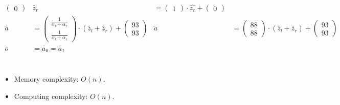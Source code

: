 \begin{align*}
\begin{pmatrix}0\end{pmatrix}
&
\widetilde{z_r} &=
\begin{pmatrix}1\end{pmatrix}
\cdot \widehat{z_r} +
\begin{pmatrix}0\end{pmatrix}\\
%
\widetilde{a} &=
\begin{pmatrix}\frac{1}{\alpha_l+\alpha_r}\\
\frac{1}{\alpha_l+\alpha_r}\end{pmatrix}
\cdot (\widetilde{z_l} + \widetilde{z_r}) +
\begin{pmatrix}93\\93\end{pmatrix}
&
\widetilde{a} &=
\begin{pmatrix}88\\88\end{pmatrix}
\cdot (\widetilde{z_l} + \widetilde{z_r}) +
\begin{pmatrix}93\\93\end{pmatrix}\\
%
o &= \widetilde{a_0} = \widetilde{a_1} \\
\end{align*}\\


%
%


\begin{itemize}

  \item Memory complexity: $O(n)$.

  \item Computing complexity: $O(n)$.

\end{itemize}


